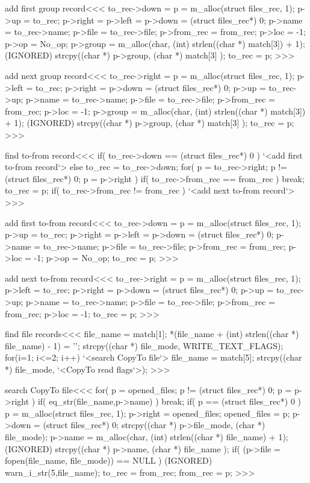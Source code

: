 \<add first group record\><<<
to_rec->down = p = m_alloc(struct files_rec, 1);  
p->up = to_rec;
p->right = p->left = p->down = (struct files_rec*) 0;
p->name = to_rec->name;  
p->file = to_rec->file;  
p->from_rec = from_rec;  
p->loc = -1;  
p->op = No_op;
p->group = m_alloc(char, (int) strlen((char *) match[3]) + 1);
(IGNORED) strcpy((char *)  p->group, (char *) match[3] );
to_rec = p;
>>>

\<add next group record\><<<
to_rec->right = p = m_alloc(struct files_rec, 1);
p->left = to_rec;
p->right = p->down = (struct files_rec*) 0;
p->up = to_rec->up;
p->name = to_rec->name;  
p->file = to_rec->file;  
p->from_rec = from_rec;  
p->loc = -1;  
p->group = m_alloc(char, (int) strlen((char *) match[3]) + 1);
(IGNORED) strcpy((char *)  p->group, (char *) match[3] );
to_rec = p;
>>>



\<find to-from record\><<<
if( to_rec->down == (struct files_rec*) 0 ){
  `<add first to-from record`>
} else {
  to_rec = to_rec->down;
  for( p = to_rec->right; p != (struct files_rec*) 0;  p = p->right ){
    if( to_rec->from_rec == from_rec ){ break; }
    to_rec = p;
  }
  if( to_rec->from_rec != from_rec ){ 
    `<add next to-from record`>
} }
>>>

\<add first to-from record\><<<
to_rec->down = p = m_alloc(struct files_rec, 1);  
p->up = to_rec;
p->right = p->left = p->down = (struct files_rec*) 0;
p->name = to_rec->name;  
p->file = to_rec->file;  
p->from_rec = from_rec;  
p->loc = -1;  
p->op = No_op;
to_rec = p;
>>>

\<add next to-from record\><<<
to_rec->right = p = m_alloc(struct files_rec, 1);
p->left = to_rec;
p->right = p->down = (struct files_rec*) 0;
p->up = to_rec->up;
p->name = to_rec->name;  
p->file = to_rec->file;  
p->from_rec = from_rec;  
p->loc = -1;  
to_rec = p;
>>>


\<find file records\><<<
file_name = match[1];  
*(file_name + (int) strlen((char *) file_name) - 1) = '\0';
strcpy((char *) file_mode, WRITE_TEXT_FLAGS);
for(i=1; i<=2; i++){
  `<search CopyTo file`>
  file_name = match[5];  
  strcpy((char *) file_mode, `<CopyTo read flags`>);
}
>>>









\<search CopyTo file\><<<
for( p = opened_files; p != (struct files_rec*) 0;  p = p->right ){
   if( eq_str(file_name,p->name) ) { break; }
}
if( p == (struct files_rec*) 0 ){
  p = m_alloc(struct files_rec, 1);
  p->right = opened_files;   opened_files = p;
  p->down =  (struct files_rec*) 0;
  strcpy((char *) p->file_mode, (char *) file_mode);
  p->name = m_alloc(char, (int) strlen((char *) file_name) + 1);
  (IGNORED) strcpy((char *)  p->name, (char *) file_name );
  if( (p->file = fopen(file_name, file_mode)) == NULL )
    { (IGNORED) warn_i_str(5,file_name); }
} 
to_rec = from_rec;  from_rec = p;
>>>


